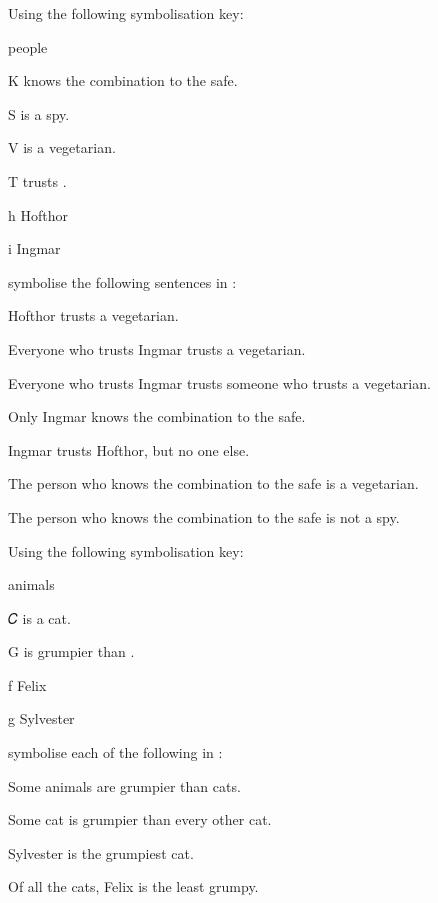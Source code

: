 \problempart
Using the following symbolisation key:
\begin{ekey}
\item[\text{domain}] people
\item[K\meta{x}]  knows the combination to the safe.
\item[S\meta{x}]  is a spy.
\item[V\meta{x}]  is a vegetarian.
\item[T\meta{xy}]  trusts .
\item[h] Hofthor
\item[i] Ingmar
\end{ekey}
symbolise the following sentences in \FOL:
\begin{earg}
\item Hofthor trusts a vegetarian.
\item Everyone who trusts Ingmar trusts a vegetarian.
\item Everyone who trusts Ingmar trusts someone who trusts a vegetarian.
\item Only Ingmar knows the combination to the safe.
\item Ingmar trusts Hofthor, but no one else.
\item The person who knows the combination to the safe is a vegetarian.
\item The person who knows the combination to the safe is not a spy.
\end{earg}


\problempart
Using the following symbolisation key:
\begin{ekey}
\item[\text{domain}] animals
\item[𝐶\meta{x}]  is a cat.
\item[G\meta{xy}]  is grumpier than .
\item[f] Felix 
\item[g] Sylvester
\end{ekey}
symbolise each of the following in \FOL:
\begin{earg}
\item  Some animals are grumpier than cats.
\item Some cat is grumpier than every other cat.
\item Sylvester is the grumpiest cat.
\item Of all the cats, Felix is the least grumpy.
\end{earg}

